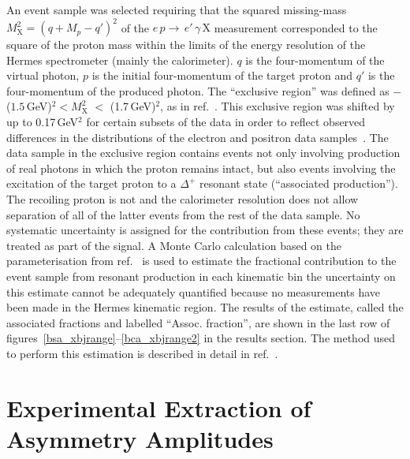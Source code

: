 An event sample was selected requiring
that the squared missing-mass $M_{\textrm{X}}^{2}=(q+M_{p}-q')^{2}$
of the $e\,p \rightarrow\, e'\,\gamma\, \textrm{X}$ measurement
corresponded to the square of the proton mass within the limits of the
energy resolution of the H{\sc ermes} spectrometer (mainly the calorimeter).  $q$ is the
four-momentum of the virtual photon, $p$ is the initial four-momentum
of the target proton and $q'$ is the four-momentum of the produced
photon. The ``exclusive region'' was defined as $-$($1.5$\,GeV)$^{2} <
M_{\textrm{X}}^{2}$ $<$ (1.7\,GeV)$^{2}$, as in
ref.~\cite{Air09}. This exclusive region was shifted by up to
0.17\,GeV$^{2}$ for certain subsets of the data in order to reflect observed differences in the distributions of the electron and positron data samples~\cite{Bur10}. 
The data sample in the exclusive region contains events not only involving  production of real photons in which the proton remains intact, but also
events involving the excitation of the target proton to a $\Delta^+$
resonant state (``associated production''). The recoiling proton is not  and the calorimeter resolution does not allow separation of all of the latter events from the rest of the data sample.
No systematic uncertainty is assigned for the contribution from these
events; they are treated as part of the signal. A Monte Carlo
calculation based on the parameterisation from ref.~\cite{Bra76} is
used to estimate the fractional contribution to the event sample from resonant
production in each kinematic bin\red{;} the uncertainty on this estimate
cannot be adequately quantified because no measurements have been made
in the H{\sc ermes} kinematic region. The results of the estimate, called the associated fractions and labelled ``Assoc. fraction'', are shown in the last row of figures~\ref{bsa_xbjrange}--\ref{bca_xbjrange2} in the results section. The method used to perform this estimation is described in detail in
ref.~\cite{Air08}.

\section{Experimental Extraction of Asymmetry Amplitudes}


